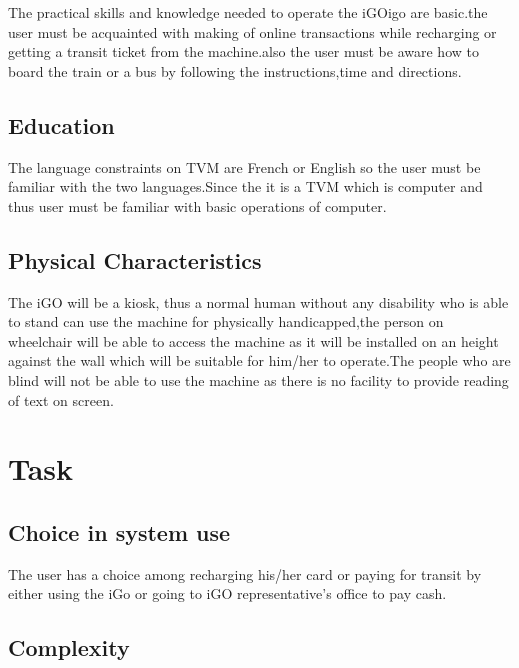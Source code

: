 \documentclass[12pt]{report}
\begin{document}
The practical skills and knowledge needed to operate the iGO\gls{igo} are basic.the user must be acquainted with making of online transactions while recharging or getting a transit ticket from the machine.also the user must be aware how to board the train or a bus by following the instructions,time and directions.\par


\subsection{Education}

The language constraints on TVM are French or English so the user must be familiar with the two languages.Since the it is a TVM which is computer and thus user must be familiar with basic operations of computer.\par

\subsection{Physical Characteristics}

The iGO will be a kiosk, thus a normal human without any disability who is able to stand can use the machine for physically handicapped,the person on wheelchair will be able to access the machine as it will be installed on an height against the wall which will be suitable for him/her to operate.The people who are blind will not be able to use the machine as there is no facility to provide reading of text on screen.\par


\vspace{\baselineskip}
\section{Task}

\subsection{Choice in system use}

The user has a choice among recharging his/her card or paying for transit by either using the iGo or going to iGO representative's office to pay cash.\par


\vspace{\baselineskip}
\subsection{Complexity}
\end{document}
